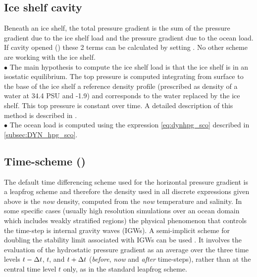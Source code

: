 \documentclass[../main/NEMO_manual]{subfiles}
\begin{document}
\subsection{Ice shelf cavity}
\label{subsec:DYN_hpg_isf}
Beneath an ice shelf, the total pressure gradient is the sum of the pressure gradient due to the ice shelf load and
the pressure gradient due to the ocean load.
If cavity opened () these 2 terms can be calculated by
setting .
No other scheme are working with the ice shelf.\\

$\bullet$ The main hypothesis to compute the ice shelf load is that the ice shelf is in an isostatic equilibrium.
The top pressure is computed integrating from surface to the base of the ice shelf a reference density profile
(prescribed as density of a water at 34.4 PSU and -1.9) and
corresponds to the water replaced by the ice shelf.
This top pressure is constant over time.
A detailed description of this method is described in \citet{Losch2008}.\\

$\bullet$ The ocean load is computed using the expression \autoref{eq:dynhpg_sco} described in
\autoref{subsec:DYN_hpg_sco}. 

\subsection{Time-scheme (\protect{})}
\label{subsec:DYN_hpg_imp}

The default time differencing scheme used for the horizontal pressure gradient is a leapfrog scheme and
therefore the density used in all discrete expressions given above is the  \textit{now} density,
computed from the \textit{now} temperature and salinity.
In some specific cases
(usually high resolution simulations over an ocean domain which includes weakly stratified regions)
the physical phenomenon that controls the time-step is internal gravity waves (IGWs).
A semi-implicit scheme for doubling the stability limit associated with IGWs can be used
\citep{Brown_Campana_MWR78, Maltrud1998}.
It involves the evaluation of the hydrostatic pressure gradient as
an average over the three time levels $t-\Delta t$, $t$, and $t+\Delta t$
(\ie \textit{before}, \textit{now} and  \textit{after} time-steps),
rather than at the central time level $t$ only, as in the standard leapfrog scheme. 
\end{document}
